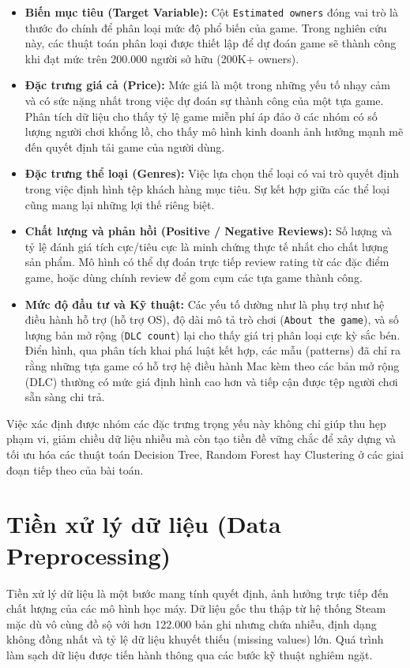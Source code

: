\begin{itemize}
    \item \textbf{Biến mục tiêu (Target Variable):} Cột \texttt{Estimated owners} đóng vai trò là thước đo chính để phân loại mức độ phổ biến của game. Trong nghiên cứu này, các thuật toán phân loại được thiết lập để dự đoán game sẽ thành công khi đạt mức trên 200.000 người sở hữu (200K+ owners).
    
    \item \textbf{Đặc trưng giá cả (Price):} Mức giá là một trong những yếu tố nhạy cảm và có sức nặng nhất trong việc dự đoán sự thành công của một tựa game. Phân tích dữ liệu cho thấy tỷ lệ game miễn phí áp đảo ở các nhóm có số lượng người chơi khổng lồ, cho thấy mô hình kinh doanh ảnh hưởng mạnh mẽ đến quyết định tải game của người dùng.
    
    \item \textbf{Đặc trưng thể loại (Genres):} Việc lựa chọn thể loại có vai trò quyết định trong việc định hình tệp khách hàng mục tiêu. Sự kết hợp giữa các thể loại cũng mang lại những lợi thế riêng biệt.
    
    \item \textbf{Chất lượng và phản hồi (Positive / Negative Reviews):} Số lượng và tỷ lệ đánh giá tích cực/tiêu cực là minh chứng thực tế nhất cho chất lượng sản phẩm. Mô hình có thể dự đoán trực tiếp review rating từ các đặc điểm game, hoặc dùng chính review để gom cụm các tựa game thành công.
    
    \item \textbf{Mức độ đầu tư và Kỹ thuật:} Các yếu tố dường như là phụ trợ như hệ điều hành hỗ trợ (hỗ trợ OS), độ dài mô tả trò chơi (\texttt{About the game}), và số lượng bản mở rộng (\texttt{DLC count}) lại cho thấy giá trị phân loại cực kỳ sắc bén. Điển hình, qua phân tích khai phá luật kết hợp, các mẫu (patterns) đã chỉ ra rằng những tựa game có hỗ trợ hệ điều hành Mac kèm theo các bản mở rộng (DLC) thường có mức giá định hình cao hơn và tiếp cận được tệp người chơi sẵn sàng chi trả.
\end{itemize}

\hspace{1cm} Việc xác định được nhóm các đặc trưng trọng yếu này không chỉ giúp thu hẹp phạm vi, giảm chiều dữ liệu nhiễu mà còn tạo tiền đề vững chắc để xây dựng và tối ưu hóa các thuật toán Decision Tree, Random Forest hay Clustering ở các giai đoạn tiếp theo của bài toán.


\newpage
\section{Tiền xử lý dữ liệu (Data Preprocessing)}
\hspace{1cm} Tiền xử lý dữ liệu là một bước mang tính quyết định, ảnh hưởng trực tiếp đến chất lượng của các mô hình học máy. Dữ liệu gốc thu thập từ hệ thống Steam mặc dù vô cùng đồ sộ với hơn 122.000 bản ghi nhưng chứa nhiễu, định dạng không đồng nhất và tỷ lệ dữ liệu khuyết thiếu (missing values) lớn. Quá trình làm sạch dữ liệu được tiến hành thông qua các bước kỹ thuật nghiêm ngặt.

